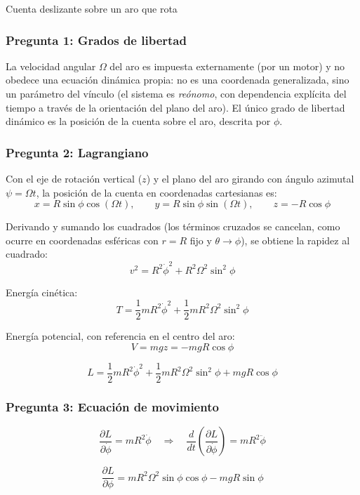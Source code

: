 \begin{solucion}{Cuenta deslizante sobre un aro que rota}
\subsubsection*{Pregunta 1: Grados de libertad}

La velocidad angular $\Omega$ del aro es impuesta externamente (por un motor) y no obedece una ecuación dinámica propia: no es una coordenada generalizada, sino un parámetro del vínculo (el sistema es \emph{reónomo}, con dependencia explícita del tiempo a través de la orientación del plano del aro). El único grado de libertad dinámico es la posición de la cuenta sobre el aro, descrita por $\phi$.

\subsubsection*{Pregunta 2: Lagrangiano}

Con el eje de rotación vertical ($z$) y el plano del aro girando con ángulo azimutal $\psi = \Omega t$, la posición de la cuenta en coordenadas cartesianas es:
$$x = R\sin\phi\cos(\Omega t), \qquad y = R\sin\phi\sin(\Omega t), \qquad z = -R\cos\phi$$

Derivando y sumando los cuadrados (los términos cruzados se cancelan, como ocurre en coordenadas esféricas con $r=R$ fijo y $\theta \to \phi$), se obtiene la rapidez al cuadrado:
$$v^2 = R^2\dot\phi^2 + R^2\Omega^2\sin^2\phi$$

Energía cinética:
$$T = \frac{1}{2}mR^2\dot\phi^2 + \frac{1}{2}mR^2\Omega^2\sin^2\phi$$

Energía potencial, con referencia en el centro del aro:
$$V = mgz = -mgR\cos\phi$$

$$\boxed{L = \frac{1}{2}mR^2\dot\phi^2 + \frac{1}{2}mR^2\Omega^2\sin^2\phi + mgR\cos\phi}$$

\subsubsection*{Pregunta 3: Ecuación de movimiento}

$$\frac{\partial L}{\partial\dot\phi} = mR^2\dot\phi \quad\Rightarrow\quad \frac{d}{dt}\left(\frac{\partial L}{\partial\dot\phi}\right) = mR^2\ddot\phi$$

$$\frac{\partial L}{\partial\phi} = mR^2\Omega^2\sin\phi\cos\phi - mgR\sin\phi$$


\end{solucion}
